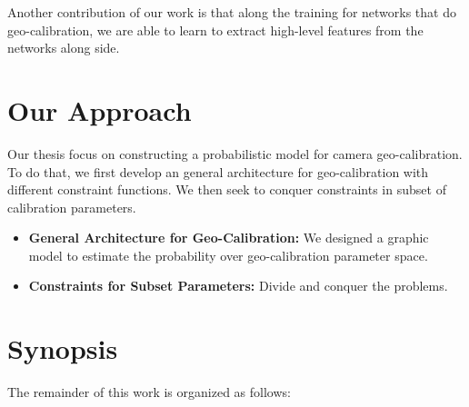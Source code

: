 Another contribution of our work is that along the training for
networks that do geo-calibration, we are able to learn to extract
high-level features from the networks along side.


\section{Our Approach}
Our thesis focus on constructing a probabilistic model for camera
geo-calibration. To do that, we first develop an general architecture
for geo-calibration with different constraint functions. We then seek
to conquer constraints in subset of calibration parameters.

\begin{itemize}[noitemsep]
  \item \textbf{General Architecture for Geo-Calibration:}
  We designed a graphic model to estimate the probability over
  geo-calibration parameter space.

  \item \textbf{Constraints for Subset Parameters:}
  Divide and conquer the problems.

\end{itemize}


\section{Synopsis}

The remainder of this work is organized as follows:
  
